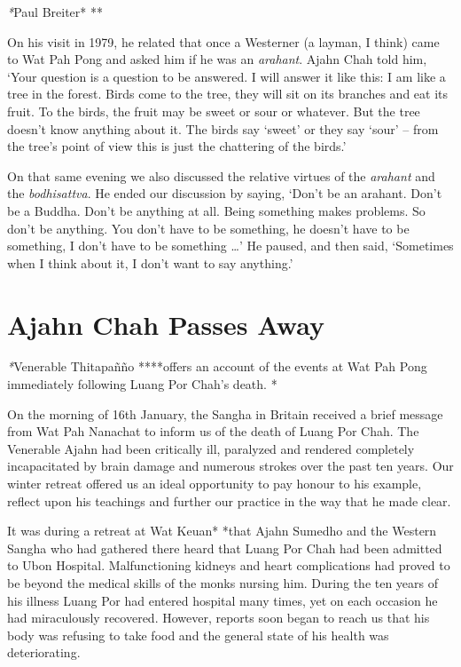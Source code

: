 \emph{*}Paul Breiter* **

On his visit in 1979, he related that once a Westerner (a layman, I
think) came to Wat Pah Pong and asked him if he was an \emph{arahant}. 
Ajahn Chah told him, `Your question is a question to be answered. I will
answer it like this: I am like a tree in the forest. Birds come to the
tree, they will sit on its branches and eat its fruit. To the birds, the
fruit may be sweet or sour or whatever. But the tree doesn't know
anything about it. The birds say `sweet' or they say `sour' -- from the
tree's point of view this is just the chattering of the birds.'

On that same evening we also discussed the relative virtues of the
\emph{arahant} and the \emph{bodhisattva}. He ended our discussion by
saying, `Don't be an arahant. Don't be a Buddha. Don't be anything at
all. Being something makes problems. So don't be anything. You don't
have to be something, he doesn't have to be something, I don't have to
be something \ldots{}' He paused, and then said, `Sometimes when I think
about it, I don't want to say anything.'

\chapter{Ajahn Chah Passes Away}

\emph{*}Venerable Thitapañño ****offers an account of the events at Wat
Pah Pong immediately following Luang Por Chah's death. *

On the morning of 16th January, the Sangha in Britain received a brief
message from Wat Pah Nanachat to inform us of the death of Luang Por
Chah. The Venerable Ajahn had been critically ill, paralyzed and
rendered completely incapacitated by brain damage and numerous strokes
over the past ten years. Our winter retreat offered us an ideal
opportunity to pay honour to his example, reflect upon his teachings and
further our practice in the way that he made clear. 

It was during a retreat at Wat Keuan* *that Ajahn Sumedho and the
Western Sangha who had gathered there heard that Luang Por Chah had been
admitted to Ubon Hospital. Malfunctioning kidneys and heart
complications had proved to be beyond the medical skills of the monks
nursing him. During the ten years of his illness Luang Por had entered
hospital many times, yet on each occasion he had miraculously recovered. 
However, reports soon began to reach us that his body was refusing to
take food and the general state of his health was deteriorating. 

